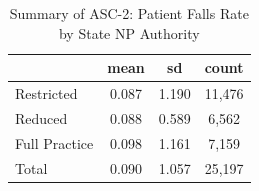 \begin{table}[htbp]\centering
\def\sym#1{\ifmmode^{#1}\else\(^{#1}\)\fi}
\caption{Summary of ASC-2: Patient Falls Rate by State NP Authority}
\begin{tabular}{l*{1}{ccc}}
\toprule
                    &        mean&          sd&       count\\
\midrule
Restricted          &       0.087&       1.190&      11,476\\
Reduced             &       0.088&       0.589&       6,562\\
Full Practice       &       0.098&       1.161&       7,159\\
Total               &       0.090&       1.057&      25,197\\
\bottomrule
\end{tabular}
\end{table}
